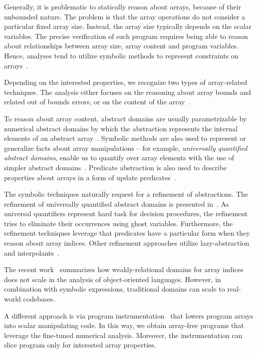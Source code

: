 Generally, it is problematic to statically reason about arrays, because of
their unbounded nature. The problem is that the array operations do not
consider a particular fixed array size. Instead, the array size typically
depends on the scalar variables. The precise verification of such program
requires being able to reason about relationships between array size, array
content and program variables. Hence, analyses tend to utilize symbolic methods
to represent constraints on arrays~\cite{Gopan2005}.

Depending on the interested properties, we recognize two types of array-related
techniques. The analysis either focuses on the reasoning about array bounds and
related out of bounds errors, or on the content of the array~\cite{Halbwachs2008}.

To reason about array content, abstract domains are usually para\-me\-tri\-zable by
numerical abstract domains by which the abstraction represents the internal
elements of an abstract array~\cite{Cousot2011p}. Symbolic methods are also
used to represent or generalize facts about array manipulations -- for example,
\emph{universally quantified abstract domains}, enable us to quantify over array
elements with the use of simpler abstract domains~\cite{Gulwani2008}.
Predicate abstraction is also used to describe properties about arrays in a
form of update predicates~\cite{Kovacs2009}.

The symbolic techniques naturally request for a refinement of abstractions.
The refinement of universally quantified abstract domains is presented
in~\cite{Seghir2009}.  As universal quantifiers represent hard task for
decision procedures, the refinement tries to eliminate their occurrences using
ghost variables. Furthermore, the refinement techniques leverage that
predicates have a particular form when they reason about array indices. Other
refinement approaches utilize lazy-abstraction~\cite{Alberti2012} and
interpolants~\cite{Alberti2012b}.

The recent work~\cite{Payet2018} summarizes how weakly-relational domains for
array indices does not scale in the analysis of object-oriented languages.
However, in combination with symbolic expressions, traditional domains can
scale to real-world codebases.

A different approach is via program instrumentation~\cite{Cornish2015} that
lowers program arrays into scalar manipulating code. In this way, we obtain
array-free programs that leverage the fine-tuned numerical analysis. Moreover,
the instrumentation can slice program only for interested array properties.

